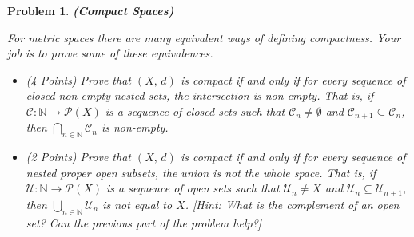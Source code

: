 \documentclass{article}
\theoremstyle{normal}
\newtheorem{problem}{Problem}
\begin{document}
    \begin{problem}
        \textbf{(Compact Spaces)}
        \par\hfill\par
        For metric spaces there are many equivalent ways of defining
        compactness. Your job is to prove some of these equivalences.
        \begin{itemize}
            \item (4 Points) Prove that $(X,\,d)$ is compact if and only if
                for every sequence of closed non-empty nested sets, the
                intersection is non-empty. That is, if
                $\mathcal{C}:\mathbb{N}\rightarrow\mathcal{P}(X)$ is a sequence
                of closed sets such that $\mathcal{C}_{n}\ne\emptyset$ and
                $\mathcal{C}_{n+1}\subseteq\mathcal{C}_{n}$, then
                $\bigcap_{n\in\mathbb{N}}\mathcal{C}_{n}$ is non-empty.
            \item (2 Points) Prove that $(X,\,d)$ is compact if and only if for
                every sequence of nested proper open subsets, the union is not
                the whole space. That is, if
                $\mathcal{U}:\mathbb{N}\rightarrow\mathcal{P}(X)$ is a sequence
                of open sets such that $\mathcal{U}_{n}\ne{X}$ and
                $\mathcal{U}_{n}\subseteq\mathcal{U}_{n+1}$, then
                $\bigcup_{n\in\mathbb{N}}\mathcal{U}_{n}$ is not equal to $X$.
                [Hint: What is the complement of an open set? Can the previous
                part of the problem help?]
        \end{itemize}
    \end{problem}
    \color{black}
\end{document}
